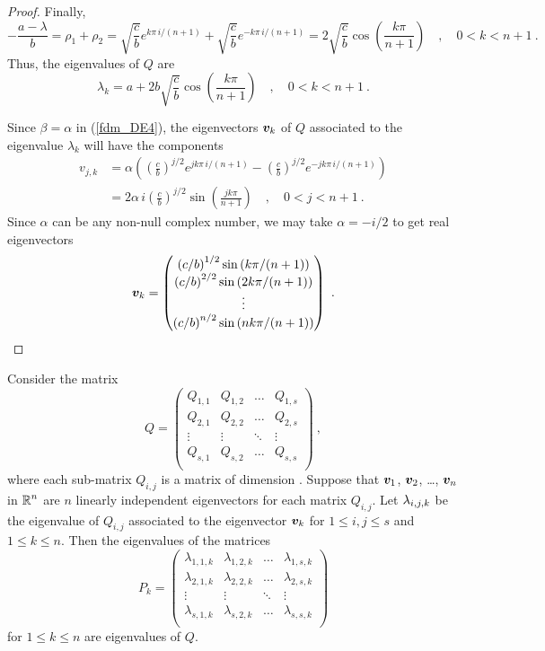 \begin{proof}
Finally,
\[
- \frac{a-\lambda}{b} = \rho_1+\rho_2 = 
\sqrt{\frac{c}{b}} e^{k\pi\,i/(n+1)} + 
\sqrt{\frac{c}{b}} e^{-k\pi\,i/(n+1)} =
2 \sqrt{\frac{c}{b}} \cos\left(\frac{k\pi}{n+1}\right)
\quad , \quad 0 < k < n+1 \ .
\]
Thus, the eigenvalues of $Q$ are
\[
\lambda_k = a + 2 b \sqrt{\frac{c}{b}} \cos\left(\frac{k\pi}{n+1}\right)
\quad , \quad 0 < k < n+1 \ .
\]

Since $\beta = \alpha$ in (\ref{fdm_DE4}), the eigenvectors
$\bm{v}_k$ of $Q$ associated to the eigenvalue $\lambda_k$ will have
the components
\begin{align*}
v_{j,k} &= \alpha \left(\left(\frac{c}{b}\right)^{j/2} e^{jk\pi\,i/(n+1)}
- \left(\frac{c}{b}\right)^{j/2} e^{-jk\pi\,i/(n+1)}\right) \\
&= 2 \alpha \,i \left(\frac{c}{b}\right)^{j/2}
\sin\left(\frac{jk\pi}{n+1}\right) \quad, \quad
0 < j < n+1 \ .
\end{align*}
Since $\alpha$ can be any non-null complex number, we may
take $\alpha =-i/2$ to get real eigenvectors
\[
\bm{v}_k =
\begin{pmatrix}
\left(c/b\right)^{1/2} \sin\left(k\pi/(n+1)\right) \\
\left(c/b\right)^{2/2} \sin\left(2k\pi/(n+1)\right) \\
\vdots \\
\left(c/b\right)^{n/2} \sin\left(nk\pi/(n+1)\right)
\end{pmatrix} \ .  \qedhere
\]
\end{proof}

\begin{prop}\label{fdm_eig_RR}
Consider the matrix
\[
Q =
\begin{pmatrix}
Q_{1,1} & Q_{1,2} & \ldots & Q_{1,s} \\
Q_{2,1} & Q_{2,2} & \ldots & Q_{2,s} \\
\vdots & \vdots & \ddots & \vdots \\
Q_{s,1} & Q_{s,2} & \ldots & Q_{s,s} \\
\end{pmatrix} \ ,
\]
where each sub-matrix $Q_{i,j}$ is a matrix of dimension \nn.
Suppose that $\bm{v}_1$, $\bm{v}_2$, \ldots, $\bm{v}_n$ in
$\displaystyle \mathbb{R}^n$ are $n$ linearly independent eigenvectors for
each matrix $Q_{i,j}$.
Let $\displaystyle \lambda_{i,j,k}$ be the eigenvalue of $Q_{i,j}$
associated to the eigenvector $\bm{v}_k$ for $1\leq i, j \leq s$ and
$1\leq k \leq n$.  Then the eigenvalues of the  matrices
\[
P_k =
\begin{pmatrix}
\lambda_{1,1,k} & \lambda_{1,2,k} & \ldots & \lambda_{1,s,k} \\
\lambda_{2,1,k} & \lambda_{2,2,k} & \ldots & \lambda_{2,s,k} \\
\vdots & \vdots & \ddots & \vdots \\
\lambda_{s,1,k} & \lambda_{s,2,k} & \ldots & \lambda_{s,s,k} \\
\end{pmatrix}
\]
for $1 \leq k \leq n$ are eigenvalues of $Q$.
\end{prop}

